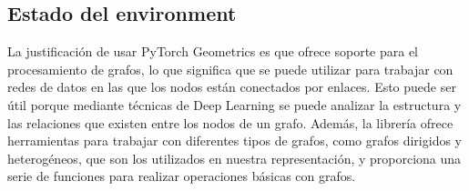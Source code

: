 \subsection{Estado del environment}
La justificación de usar PyTorch Geometrics es que ofrece soporte para el procesamiento de grafos,
lo que significa que se puede utilizar para trabajar con redes de datos en las que los nodos están
conectados por enlaces. Esto puede ser útil porque mediante técnicas de Deep Learning se puede analizar
la estructura y las relaciones que existen entre los nodos de un grafo. Además, la librería ofrece herramientas
para trabajar con diferentes tipos de grafos, como grafos dirigidos y heterogéneos, que son los utilizados en
nuestra representación, y proporciona una serie de funciones para realizar operaciones básicas con grafos.
